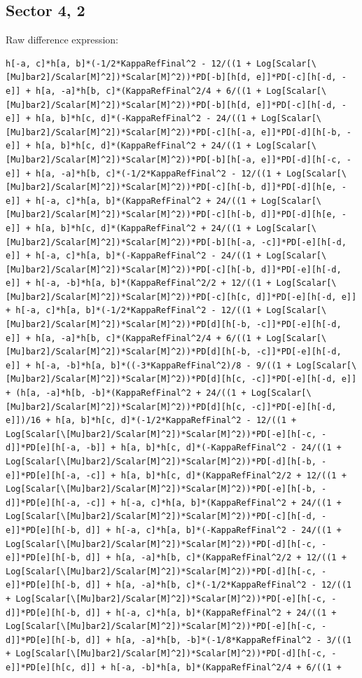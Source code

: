 \documentclass[11pt]{article}
\begin{document}
\subsection*{Sector {4, 2}}
Raw difference expression:
\begin{verbatim}
h[-a, c]*h[a, b]*(-1/2*KappaRefFinal^2 - 12/((1 + Log[Scalar[\[Mu]bar2]/Scalar[M]^2])*Scalar[M]^2))*PD[-b][h[d, e]]*PD[-c][h[-d, -e]] + h[a, -a]*h[b, c]*(KappaRefFinal^2/4 + 6/((1 + Log[Scalar[\[Mu]bar2]/Scalar[M]^2])*Scalar[M]^2))*PD[-b][h[d, e]]*PD[-c][h[-d, -e]] + h[a, b]*h[c, d]*(-KappaRefFinal^2 - 24/((1 + Log[Scalar[\[Mu]bar2]/Scalar[M]^2])*Scalar[M]^2))*PD[-c][h[-a, e]]*PD[-d][h[-b, -e]] + h[a, b]*h[c, d]*(KappaRefFinal^2 + 24/((1 + Log[Scalar[\[Mu]bar2]/Scalar[M]^2])*Scalar[M]^2))*PD[-b][h[-a, e]]*PD[-d][h[-c, -e]] + h[a, -a]*h[b, c]*(-1/2*KappaRefFinal^2 - 12/((1 + Log[Scalar[\[Mu]bar2]/Scalar[M]^2])*Scalar[M]^2))*PD[-c][h[-b, d]]*PD[-d][h[e, -e]] + h[-a, c]*h[a, b]*(KappaRefFinal^2 + 24/((1 + Log[Scalar[\[Mu]bar2]/Scalar[M]^2])*Scalar[M]^2))*PD[-c][h[-b, d]]*PD[-d][h[e, -e]] + h[a, b]*h[c, d]*(KappaRefFinal^2 + 24/((1 + Log[Scalar[\[Mu]bar2]/Scalar[M]^2])*Scalar[M]^2))*PD[-b][h[-a, -c]]*PD[-e][h[-d, e]] + h[-a, c]*h[a, b]*(-KappaRefFinal^2 - 24/((1 + Log[Scalar[\[Mu]bar2]/Scalar[M]^2])*Scalar[M]^2))*PD[-c][h[-b, d]]*PD[-e][h[-d, e]] + h[-a, -b]*h[a, b]*(KappaRefFinal^2/2 + 12/((1 + Log[Scalar[\[Mu]bar2]/Scalar[M]^2])*Scalar[M]^2))*PD[-c][h[c, d]]*PD[-e][h[-d, e]] + h[-a, c]*h[a, b]*(-1/2*KappaRefFinal^2 - 12/((1 + Log[Scalar[\[Mu]bar2]/Scalar[M]^2])*Scalar[M]^2))*PD[d][h[-b, -c]]*PD[-e][h[-d, e]] + h[a, -a]*h[b, c]*(KappaRefFinal^2/4 + 6/((1 + Log[Scalar[\[Mu]bar2]/Scalar[M]^2])*Scalar[M]^2))*PD[d][h[-b, -c]]*PD[-e][h[-d, e]] + h[-a, -b]*h[a, b]*((-3*KappaRefFinal^2)/8 - 9/((1 + Log[Scalar[\[Mu]bar2]/Scalar[M]^2])*Scalar[M]^2))*PD[d][h[c, -c]]*PD[-e][h[-d, e]] + (h[a, -a]*h[b, -b]*(KappaRefFinal^2 + 24/((1 + Log[Scalar[\[Mu]bar2]/Scalar[M]^2])*Scalar[M]^2))*PD[d][h[c, -c]]*PD[-e][h[-d, e]])/16 + h[a, b]*h[c, d]*(-1/2*KappaRefFinal^2 - 12/((1 + Log[Scalar[\[Mu]bar2]/Scalar[M]^2])*Scalar[M]^2))*PD[-e][h[-c, -d]]*PD[e][h[-a, -b]] + h[a, b]*h[c, d]*(-KappaRefFinal^2 - 24/((1 + Log[Scalar[\[Mu]bar2]/Scalar[M]^2])*Scalar[M]^2))*PD[-d][h[-b, -e]]*PD[e][h[-a, -c]] + h[a, b]*h[c, d]*(KappaRefFinal^2/2 + 12/((1 + Log[Scalar[\[Mu]bar2]/Scalar[M]^2])*Scalar[M]^2))*PD[-e][h[-b, -d]]*PD[e][h[-a, -c]] + h[-a, c]*h[a, b]*(KappaRefFinal^2 + 24/((1 + Log[Scalar[\[Mu]bar2]/Scalar[M]^2])*Scalar[M]^2))*PD[-c][h[-d, -e]]*PD[e][h[-b, d]] + h[-a, c]*h[a, b]*(-KappaRefFinal^2 - 24/((1 + Log[Scalar[\[Mu]bar2]/Scalar[M]^2])*Scalar[M]^2))*PD[-d][h[-c, -e]]*PD[e][h[-b, d]] + h[a, -a]*h[b, c]*(KappaRefFinal^2/2 + 12/((1 + Log[Scalar[\[Mu]bar2]/Scalar[M]^2])*Scalar[M]^2))*PD[-d][h[-c, -e]]*PD[e][h[-b, d]] + h[a, -a]*h[b, c]*(-1/2*KappaRefFinal^2 - 12/((1 + Log[Scalar[\[Mu]bar2]/Scalar[M]^2])*Scalar[M]^2))*PD[-e][h[-c, -d]]*PD[e][h[-b, d]] + h[-a, c]*h[a, b]*(KappaRefFinal^2 + 24/((1 + Log[Scalar[\[Mu]bar2]/Scalar[M]^2])*Scalar[M]^2))*PD[-e][h[-c, -d]]*PD[e][h[-b, d]] + h[a, -a]*h[b, -b]*(-1/8*KappaRefFinal^2 - 3/((1 + Log[Scalar[\[Mu]bar2]/Scalar[M]^2])*Scalar[M]^2))*PD[-d][h[-c, -e]]*PD[e][h[c, d]] + h[-a, -b]*h[a, b]*(KappaRefFinal^2/4 + 6/((1 + 
\end{verbatim}
\end{document}
